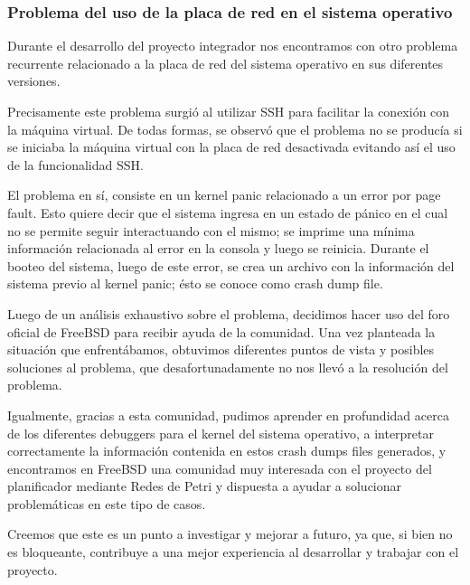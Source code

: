

\subsubsection{Problema del uso de la placa de red en el sistema operativo}

Durante el desarrollo del proyecto integrador nos encontramos con otro problema recurrente relacionado a la placa de red del sistema operativo en sus diferentes versiones.

Precisamente este problema surgió al utilizar SSH para facilitar la conexión con la máquina virtual. De todas formas, se observó que el problema no se producía si se iniciaba la máquina virtual con la placa de red desactivada evitando así el uso de la funcionalidad SSH.

El problema en sí, consiste en un kernel panic relacionado a un error por page fault. Esto quiere decir que el sistema ingresa en un estado de pánico en el cual no se permite seguir interactuando con el mismo; se imprime una mínima información relacionada al error en la consola y luego se reinicia. Durante el booteo del sistema, luego de este error, se crea un archivo con la información del sistema previo al kernel panic; ésto se conoce como crash dump file.

Luego de un análisis exhaustivo sobre el problema, decidimos hacer uso del foro oficial de FreeBSD para recibir ayuda de la comunidad. Una vez planteada la situación que enfrentábamos, obtuvimos diferentes puntos de vista y posibles soluciones al problema, que desafortunadamente no nos llevó a la resolución del problema.


Igualmente, gracias a esta comunidad, pudimos aprender en profundidad acerca de los diferentes debuggers para el kernel del sistema operativo, a interpretar correctamente la información contenida en estos crash dumps files generados, y encontramos en FreeBSD una comunidad muy interesada con el proyecto del planificador mediante Redes de Petri y dispuesta a ayudar a solucionar problemáticas en este tipo de casos.


Creemos que este es un punto a investigar y mejorar a futuro, ya que, si bien no es bloqueante, contribuye a una mejor experiencia al desarrollar y trabajar con el proyecto.

